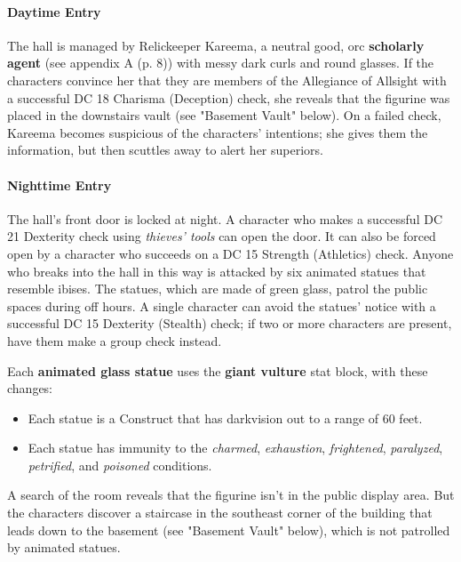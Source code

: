 \documentclass[letterpaper, 11pt, bg=full, twocolumn]{dndbook}
\begin{document}
\paragraph{Daytime Entry}

The hall is managed by Relickeeper Kareema, a neutral good, orc \textbf{scholarly agent} (see appendix A (p. 8)) with messy dark curls and round glasses. If the characters convince her that they are members of the Allegiance of Allsight with a successful DC 18 Charisma (Deception) check, she reveals that the figurine was placed in the downstairs vault (see "Basement Vault" below). On a failed check, Kareema becomes suspicious of the characters' intentions; she gives them the information, but then scuttles away to alert her superiors.

\paragraph{Nighttime Entry}

The hall's front door is locked at night. A character who makes a successful DC 21 Dexterity check using \textit{thieves' tools} can open the door. It can also be forced open by a character who succeeds on a DC 15 Strength (Athletics) check. Anyone who breaks into the hall in this way is attacked by six animated statues that resemble ibises. The statues, which are made of green glass, patrol the public spaces during off hours. A single character can avoid the statues' notice with a successful DC 15 Dexterity (Stealth) check; if two or more characters are present, have them make a group check instead.

Each \textbf{animated glass statue} uses the \textbf{giant vulture} stat block, with these changes:

\begin{itemize}
\item Each statue is a Construct that has darkvision out to a range of 60 feet.
\item Each statue has immunity to the \textit{charmed}, \textit{exhaustion}, \textit{frightened}, \textit{paralyzed}, \textit{petrified}, and \textit{poisoned} conditions.
\end{itemize}

A search of the room reveals that the figurine isn't in the public display area. But the characters discover a staircase in the southeast corner of the building that leads down to the basement (see "Basement Vault" below), which is not patrolled by animated statues.
\end{document}

